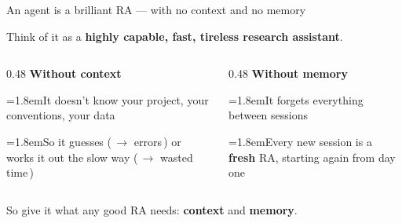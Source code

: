 \documentclass[aspectratio=169, 11pt, t]{beamer}
\newcommand{\mk}[1]{\textcolor{seeblau}{\textbf{#1}}}
\newcommand{\warn}{\textcolor{akzentrot}{\faExclamationTriangle}}
\newcommand{\hint}[2]{\par\noindent\hangindent=1.8em\hangafter=1\textcolor{seeblau}{#1}\quad #2\par}
\begin{document}
\begin{frame}{An agent is a brilliant RA --- with no context and no memory}

\centering
\large
Think of it as a \mk{highly capable, fast, tireless research assistant}.\\[1.0em]
\normalsize

\begin{columns}[T]
  \begin{column}{0.48\textwidth}
    \textbf{Without context}\\[0.4em]
    \small
    \hint{\warn}{It doesn't know your project, your conventions, your data}
    \hint{\warn}{So it guesses (\,$\rightarrow$ errors\,) or works it out the slow way (\,$\rightarrow$ wasted time\,)}
  \end{column}
  \begin{column}{0.48\textwidth}
    \textbf{Without memory}\\[0.4em]
    \small
    \hint{\warn}{It forgets everything between sessions}
    \hint{\warn}{Every new session is a \textbf{fresh} RA, starting again from day one}
  \end{column}
\end{columns}

\vfill
\centering
{\large\textcolor{seeblau}{So give it what any good RA needs: \mk{context} and \mk{memory}.}}
\vfill

\end{frame}
\end{document}
